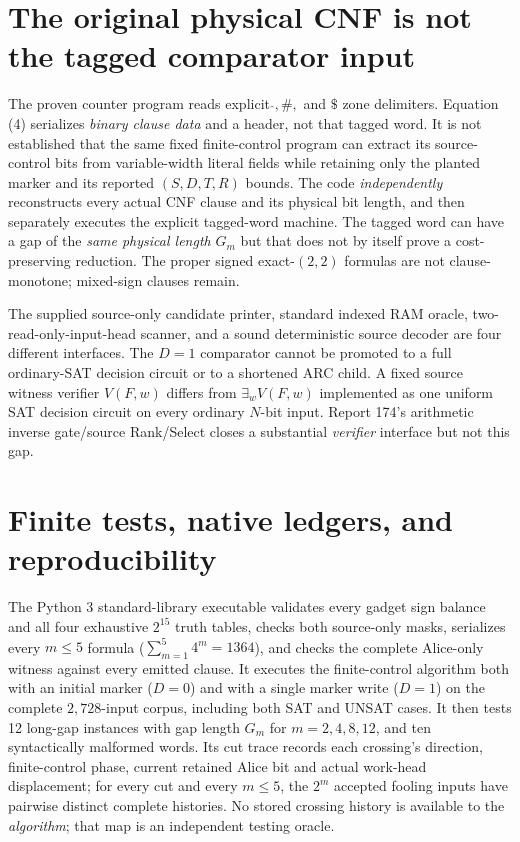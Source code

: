 \documentclass[11pt]{article}
\begin{document}
\section{The original physical CNF is not the tagged comparator input}
The proven counter program reads explicit $\hat{},\#,$ and $\$$ zone delimiters. Equation (4) serializes \emph{binary clause data} and a header, not that tagged word. It is not established that the same fixed finite-control program can extract its source-control bits from variable-width literal fields while retaining only the planted marker and its reported $(S,D,T,R)$ bounds. The code \emph{independently} reconstructs every actual CNF clause and its physical bit length, and then separately executes the explicit tagged-word machine. The tagged word can have a gap of the \emph{same physical length} $G_m$ but that does not by itself prove a cost-preserving reduction. The proper signed exact-$(2,2)$ formulas are not clause-monotone; mixed-sign clauses remain.

The supplied source-only candidate printer, standard indexed RAM oracle, two-read-only-input-head scanner, and a sound deterministic source decoder are four different interfaces. The $D=1$ comparator cannot be promoted to a full ordinary-SAT decision circuit or to a shortened ARC child. A fixed source witness verifier $V(F,w)$ differs from $\exists_wV(F,w)$ implemented as one uniform SAT decision circuit on every ordinary $N$-bit input. Report 174's arithmetic inverse gate/source Rank/Select closes a substantial \emph{verifier} interface but not this gap.

\section{Finite tests, native ledgers, and reproducibility}
The Python 3 standard-library executable validates every gadget sign balance and all four exhaustive $2^{15}$ truth tables, checks both source-only masks, serializes every $m\le5$ formula ($\sum_{m=1}^5 4^m=1364$), and checks the complete Alice-only witness against every emitted clause. It executes the finite-control algorithm both with an initial marker ($D=0$) and with a single marker write ($D=1$) on the complete $2{,}728$-input corpus, including both SAT and UNSAT cases. It then tests 12 long-gap instances with gap length $G_m$ for $m=2,4,8,12$, and ten syntactically malformed words. Its cut trace records each crossing's direction, finite-control phase, current retained Alice bit and actual work-head displacement; for every cut and every $m\le5$, the  $2^m$ accepted fooling inputs have pairwise distinct complete histories. No stored crossing history is available to the \emph{algorithm}; that map is an independent testing oracle.
\end{document}
